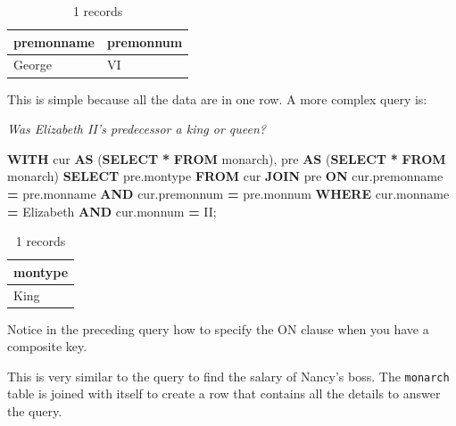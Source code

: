 \documentclass[
]{article}
\newenvironment{Shaded}{\begin{snugshade}}{\end{snugshade}}
\newcommand{\KeywordTok}[1]{\textcolor[rgb]{0.13,0.29,0.53}{\textbf{#1}}}
\newcommand{\NormalTok}[1]{#1}
\newcommand{\OperatorTok}[1]{\textcolor[rgb]{0.81,0.36,0.00}{\textbf{#1}}}
\newcommand{\StringTok}[1]{\textcolor[rgb]{0.31,0.60,0.02}{#1}}
\begin{document}
\begin{table}

\caption{\label{tab:unnamed-chunk-83}1 records}
\centering
\begin{tabular}[t]{l|l}
\hline
premonname & premonnum\\
\hline
George & VI\\
\hline
\end{tabular}
\end{table}

This is simple because all the data are in one row. A more complex query
is:

\emph{Was Elizabeth II's predecessor a king or queen?}

\begin{Shaded}
\begin{Highlighting}[]
\KeywordTok{WITH}
\NormalTok{cur }\KeywordTok{AS}\NormalTok{ (}\KeywordTok{SELECT} \OperatorTok{*} \KeywordTok{FROM}\NormalTok{ monarch), }
\NormalTok{pre }\KeywordTok{AS}\NormalTok{ (}\KeywordTok{SELECT} \OperatorTok{*} \KeywordTok{FROM}\NormalTok{ monarch) }
\KeywordTok{SELECT}\NormalTok{ pre.montype }\KeywordTok{FROM}\NormalTok{ cur }\KeywordTok{JOIN}\NormalTok{  pre}
    \KeywordTok{ON}\NormalTok{ cur.premonname }\OperatorTok{=}\NormalTok{ pre.monname }\KeywordTok{AND}\NormalTok{ cur.premonnum }\OperatorTok{=}\NormalTok{ pre.monnum}
    \KeywordTok{WHERE}\NormalTok{ cur.monname }\OperatorTok{=} \StringTok{\textquotesingle{}Elizabeth\textquotesingle{}}
    \KeywordTok{AND}\NormalTok{ cur.monnum }\OperatorTok{=} \StringTok{\textquotesingle{}II\textquotesingle{}}\NormalTok{;}
\end{Highlighting}
\end{Shaded}

\begin{table}

\caption{\label{tab:unnamed-chunk-84}1 records}
\centering
\begin{tabular}[t]{l}
\hline
montype\\
\hline
King\\
\hline
\end{tabular}
\end{table}

Notice in the preceding query how to specify the ON clause when you have
a composite key.

This is very similar to the query to find the salary of Nancy's boss.
The \texttt{monarch} table is joined with itself to create a row that contains
all the details to answer the query.
\end{document}
